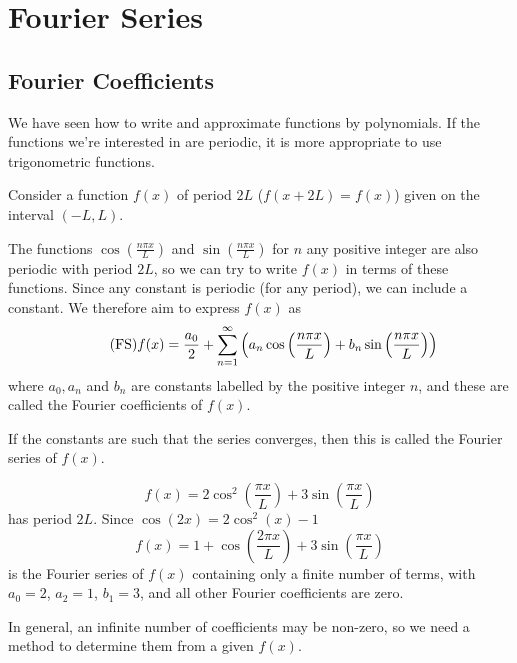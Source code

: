 \documentclass[10pt, a4paper]{article}
\begin{document}
\newpage

\section{Fourier Series}

\subsection{Fourier Coefficients}
We have seen how to write and approximate functions by polynomials.
If the functions we're interested in are periodic,
it is more appropriate to use trigonometric functions.

Consider a function $f(x)$ of period $2L$
($f(x + 2L) = f(x)$)
given on the interval $(-L, L)$.

The functions $\cos\left(\frac{n\pi x}{L}\right)$ and $\sin\left(\frac{n\pi x}{L}\right)$ for $n$ any positive integer are also periodic with period $2L$,
so we can try to write $f(x)$ in terms of these functions.
Since any constant is periodic
(for any period),
we can include a constant.
We therefore aim to express $f(x)$ as
\begin{equation}\tag{FS}
    f(x) = \frac{a_0}{2} + \infsum[n = 1]\left(a_n\cos\left(\frac{n\pi x}{L}\right) + b_n\sin\left(\frac{n\pi x}{L}\right)\right)
\end{equation}
where $a_0, a_n$ and $b_n$ are constants labelled by the positive integer $n$,
and these are called the Fourier coefficients of $f(x)$.

If the constants are such that the series converges,
then this is called the Fourier series of $f(x)$.

\begin{example}
    \[
    f(x) = 2\cos ^ 2\left(\frac{\pi x}{L}\right) + 3\sin\left(\frac{\pi x}{L}\right)
    \]
    has period $2L$.
    Since $\cos(2x) = 2\cos ^ 2(x) - 1$
    \[
    f(x) = 1 + \cos\left(\frac{2\pi x}{L}\right) + 3\sin\left(\frac{\pi x}{L}\right)
    \]
    is the Fourier series of $f(x)$ containing only a finite number of terms,
    with $a_0 = 2$,
    $a_2 = 1$,
    $b_1 = 3$,
    and all other Fourier coefficients are zero.
\end{example}

In general,
an infinite number of coefficients may be non-zero,
so we need a method to determine them from a given $f(x)$.
\end{document}
